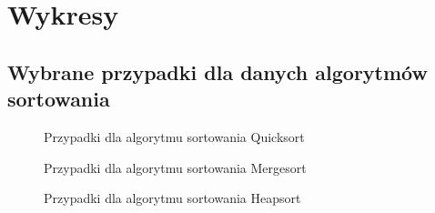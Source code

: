 \documentclass[12pt, polish]{article}
\begin{document}
\newpage
\section{Wykresy}

\subsection{Wybrane przypadki dla danych algorytmów sortowania}

\begin{figure}[ht]
	\centering
	\quad
	\caption{Przypadki dla algorytmu sortowania Quicksort}
\end{figure}

\begin{figure}[ht]
	\centering
	\quad
	\caption{Przypadki dla algorytmu sortowania Mergesort}
\end{figure}

\begin{figure}[ht]
	\centering
	\quad
	\caption{Przypadki dla algorytmu sortowania Heapsort}
\end{figure}
\end{document}
